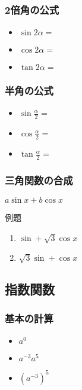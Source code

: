 \documentclass[10pt,dvipdfmx]{jsarticle}
\begin{document}
\begin{multicols}{2}


  \subsubsection*{2倍角の公式}
  \begin{large}
    \begin{itemize}
      \item $\sin2\alpha=$
      \item $\cos2\alpha=$
      \item $\tan2\alpha=$
    \end{itemize}
  \end{large}

  \subsubsection*{半角の公式}
  \begin{large}
    \begin{itemize}
      \item $\sin\frac{\alpha}{2}=$
      \item $\cos\frac{\alpha}{2}=$
      \item $\tan\frac{\alpha}{2}=$
    \end{itemize}
  \end{large}

\end{multicols}

\subsubsection*{三角関数の合成}
$a\sin x+b\cos x$\vspace{10mm}
\begin{itembox}[l]{例題}
  \begin{large}
    \begin{enumerate}
      \item $\sin +\sqrt{3}\cos x$
      \item $\sqrt{3}\sin +\cos x$
    \end{enumerate}
  \end{large}
\end{itembox}

\newpage
\subsection*{指数関数}
\subsubsection*{基本の計算}
\begin{multicols}{3}
  \begin{Large}
    \begin{itemize}
      \item $a^0$
      \item $a^{-3}a^5$
      \item $(a^{-3})^5$
    \end{itemize}
  \end{Large}
\end{multicols}
\end{document}
